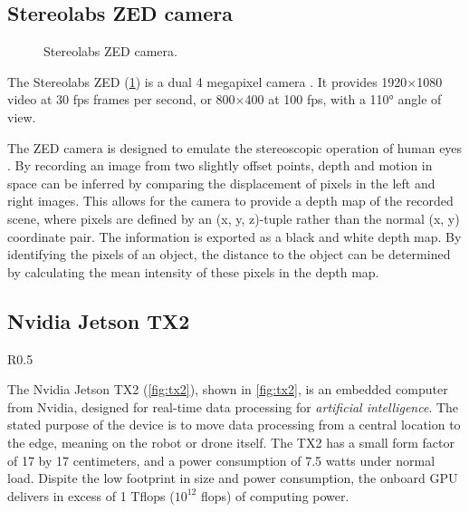 \documentclass[\rootfolder/main.tex]{subfiles}
\begin{document}

\subsection{Stereolabs ZED camera}

\begin{figure}[h]
    \caption{Stereolabs ZED camera.}
    \label{fig:zed-camera}
\end{figure}

The Stereolabs ZED (\cref{fig:zed-camera}) is a dual 4 megapixel camera \cite{Stereolabs}.
It provides 1920$\times$1080 video at 30 \acrfull{fps} frames per second, or 800$\times$400 at 100 \acrshort{fps}, with a \ang{110} angle of view.

The ZED camera is designed to emulate the stereoscopic operation of human eyes \cite{Stereolabs}.
By recording an image from two slightly offset points, depth and motion in space can be inferred by comparing the displacement of pixels in the left and right images.
This allows for the camera to provide a depth map of the recorded scene, where pixels are defined by an (x, y, z)-tuple rather than the normal (x, y) coordinate pair.
The information is exported as a black and white depth map.
By identifying the pixels of an object, the distance to the object can be determined by calculating the mean intensity of these pixels in the depth map.


\subsection{Nvidia Jetson TX2}

\begin{wrapfigure}{R}{0.5\columnwidth}
\caption[Nvidia Jetson TX2 development kit.]{Nvidia Jetson TX2 development kit, image courtesy of Nvidia\label{fig:tx2}.}
\end{wrapfigure}

The Nvidia Jetson TX2 (\cref{fig:tx2}), shown in \cref{fig:tx2}, is an embedded computer from Nvidia, designed for real-time data processing for \emph{artificial intelligence}.
The stated purpose of the device is to move data processing from a central location to the edge, meaning on the robot or drone itself.
The TX2 has a small form factor of 17 by 17 centimeters, and a power consumption of 7.5 watts under normal load.
Dispite the low footprint in size and power consumption, the onboard GPU delivers in excess of 1 T\acrshort{flops} ($10^{12}$ \acrlong{flops}) of computing power.
\end{document}
